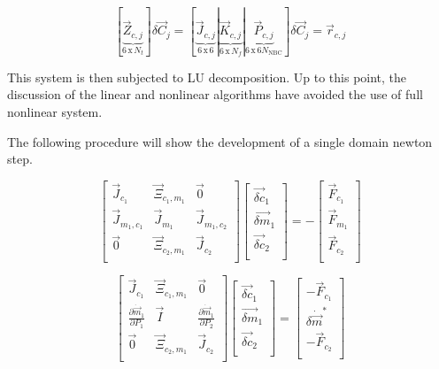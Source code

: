 \begin{equation}
\label{eqn:nbcLinSystem}
\left[\right.\underbrace{\vec{Z}_{c, j}}_{6\, \text{x}\, N_{t}}\left.\right] \delta \vec{C}_{j} = \left[\right.\underbrace{\vec{J}_{c, j}}_{6\, \text{x}\, 6}|\underbrace{\vec{K}_{c, j}}_{6\, \text{x}\, N_{f}}|{\underbrace{\vec{P}_{c, j}}_{6\, \text{x}\, 6 N_{\text{NBC}}}}\left.\right]\delta \vec{C}_{j} = \vec{r}_{c,j}
\end{equation}

This system is then subjected to LU decomposition.
Up to this point, the discussion of the linear and nonlinear algorithms have avoided the use of full nonlinear system.

The following procedure will show the development of a single domain newton step.

\begin{equation}
\label{eqn:domainMatrix}
 \begin{bmatrix} 
\vec{J}_{c_1} & \vec{\Xi}_{c_1,m_1} & \vec{0} \\
\vec{J}_{m_1,c_1} & \vec{J}_{m_1} & \vec{J}_{m_1,c_2}  \\
\vec{0} & \vec{\Xi}_{c_2,m_1} & \vec{J}_{c_2} \\
 \end{bmatrix} \begin{bmatrix}
 \vec{\delta c}_{1} \\
 \vec{\delta m}_{1} \\
 \vec{\delta c}_{2} \\
\end{bmatrix}  = -\begin{bmatrix}
 \vec{F}_{c_1} \\
 \vec{F}_{m_1} \\
 \vec{F}_{c_2} \\
\end{bmatrix}
 \end{equation}
 
 \begin{equation}
\label{eqn:domainMatrix2}
 \begin{bmatrix} 
\vec{J}_{c_1} & \vec{\Xi}_{c_1,m_1} & \vec{0} \\
\frac{\partial \dot{\vec{m}}_{1}}{\partial P_{1} } & \vec{I} & \frac{\partial \dot{\vec{m}}_{1}}{\partial P_{2} }  \\
\vec{0} & \vec{\Xi}_{c_2,m_1} & \vec{J}_{c_2} \\
 \end{bmatrix} \begin{bmatrix}
 \vec{\delta c}_{1} \\
 \vec{\delta m}_{1} \\
 \vec{\delta c}_{2} \\
\end{bmatrix}  = \begin{bmatrix}
 - \vec{F}_{c_1} \\
 \delta \dot{\vec{m}}^{*} \\
 - \vec{F}_{c_2} \\
\end{bmatrix}
 \end{equation}
 
